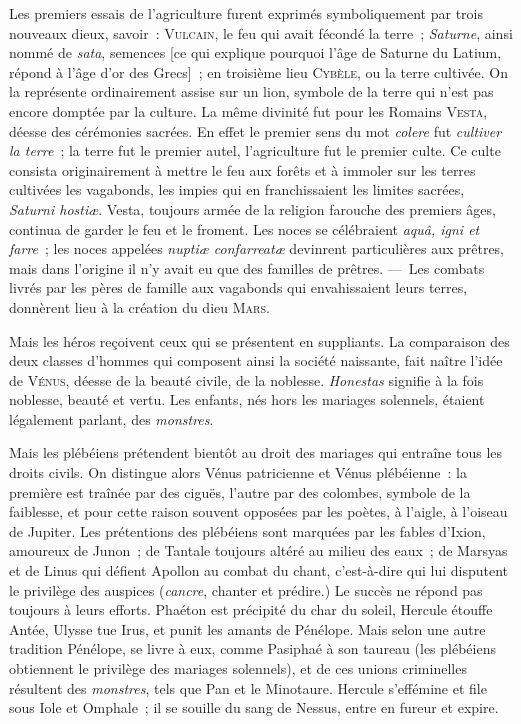 \documentclass[french,twoside]{book} %
\begin{document}
Les premiers essais de l’agriculture furent exprimés symboliquement par trois nouveaux dieux, savoir : {\scshape Vulcain}, le feu qui avait fécondé la terre ; {\itshape Saturne}, ainsi nommé de {\itshape sata}, semences [ce qui explique pourquoi l’âge de Saturne du Latium, répond à l’âge d’or des Grecs] ; en troisième lieu {\scshape Cybèle}, ou la terre cultivée. On la représente ordinairement assise sur un lion, symbole de la terre qui n’est pas encore domptée par la culture. La même divinité fut pour les Romains {\scshape Vesta}, déesse des cérémonies sacrées. En effet le premier sens du mot {\itshape colere} fut {\itshape cultiver la terre} ; la terre fut le premier autel, l’agriculture fut le premier culte. Ce culte consista originairement à mettre le feu aux forêts et à immoler sur les terres cultivées les vagabonds, les impies qui en franchissaient les limites sacrées, {\itshape Saturni hostiæ}. Vesta, toujours armée de la religion farouche des premiers âges, continua de garder le feu et le froment. Les noces se célébraient {\itshape aquâ, igni et farre} ; les noces appelées {\itshape nuptiæ confarreatæ} devinrent particulières aux prêtres, mais dans l’origine il n’y avait eu que des familles de prêtres. — Les combats livrés par les pères de famille aux vagabonds qui envahissaient leurs terres, donnèrent lieu à la création du dieu {\scshape Mars}.\par
Mais les héros reçoivent ceux qui se présentent en suppliants. La comparaison des deux classes d’hommes qui composent ainsi la société naissante, fait naître l’idée de {\scshape Vénus}, déesse de la beauté civile, de la noblesse. {\itshape Honestas} signifie à la fois noblesse, beauté et vertu. Les enfants, nés hors les mariages solennels, étaient légalement parlant, des {\itshape monstres}.\par
Mais les plébéiens prétendent bientôt au droit des mariages qui entraîne tous les droits civils. On distingue alors Vénus patricienne et Vénus plébéienne : la première est traînée par des ciguës, l’autre par des colombes, symbole de la faiblesse, et pour cette raison souvent opposées par les poètes, à l’aigle, à l’oiseau de Jupiter. Les prétentions des plébéiens sont marquées par les fables d’Ixion, amoureux de Junon ; de Tantale toujours altéré au milieu des eaux ; de Marsyas et de Linus qui défient Apollon au combat du chant, c’est-à-dire qui lui disputent le privilège des auspices ({\itshape cancre}, chanter et prédire.) Le succès ne répond pas toujours à leurs efforts. Phaéton est précipité du char du soleil,  Hercule étouffe Antée, Ulysse tue Irus, et punit les amants de Pénélope. Mais selon une autre tradition Pénélope, se livre à eux, comme Pasiphaé à son taureau (les plébéiens obtiennent le privilège des mariages solennels), et de ces unions criminelles résultent des {\itshape monstres}, tels que Pan et le Minotaure. Hercule s’effémine et file sous Iole et Omphale ; il se souille du sang de Nessus, entre en fureur et expire.\par
\end{document}
